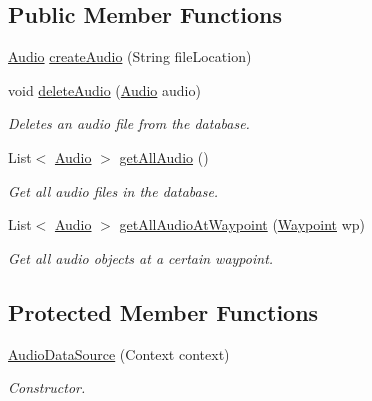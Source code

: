 \subsection*{Public Member Functions}
\begin{DoxyCompactItemize}
\item 
\hyperlink{classuk_1_1ac_1_1swan_1_1digitaltrails_1_1components_1_1_audio}{Audio} \hyperlink{classuk_1_1ac_1_1swan_1_1digitaltrails_1_1database_1_1_audio_data_source_ad6b609ca12667a0b84ca29980bc009bf}{create\+Audio} (String file\+Location)
\item 
void \hyperlink{classuk_1_1ac_1_1swan_1_1digitaltrails_1_1database_1_1_audio_data_source_aa68823a501806f868b17856d5c3da570}{delete\+Audio} (\hyperlink{classuk_1_1ac_1_1swan_1_1digitaltrails_1_1components_1_1_audio}{Audio} audio)
\begin{DoxyCompactList}\small\item\em Deletes an audio file from the database. \end{DoxyCompactList}\item 
List$<$ \hyperlink{classuk_1_1ac_1_1swan_1_1digitaltrails_1_1components_1_1_audio}{Audio} $>$ \hyperlink{classuk_1_1ac_1_1swan_1_1digitaltrails_1_1database_1_1_audio_data_source_acf590b5524ba0406a589bbad130efb4e}{get\+All\+Audio} ()
\begin{DoxyCompactList}\small\item\em Get all audio files in the database. \end{DoxyCompactList}\item 
List$<$ \hyperlink{classuk_1_1ac_1_1swan_1_1digitaltrails_1_1components_1_1_audio}{Audio} $>$ \hyperlink{classuk_1_1ac_1_1swan_1_1digitaltrails_1_1database_1_1_audio_data_source_a7ac8e452785120556a7007da429203ed}{get\+All\+Audio\+At\+Waypoint} (\hyperlink{classuk_1_1ac_1_1swan_1_1digitaltrails_1_1components_1_1_waypoint}{Waypoint} wp)
\begin{DoxyCompactList}\small\item\em Get all audio objects at a certain waypoint. \end{DoxyCompactList}\end{DoxyCompactItemize}
\subsection*{Protected Member Functions}
\begin{DoxyCompactItemize}
\item 
\hyperlink{classuk_1_1ac_1_1swan_1_1digitaltrails_1_1database_1_1_audio_data_source_ad1eb044c2825de59cf817a1bc5475242}{Audio\+Data\+Source} (Context context)
\begin{DoxyCompactList}\small\item\em Constructor. \end{DoxyCompactList}\end{DoxyCompactItemize}
